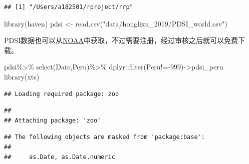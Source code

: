 \documentclass[
  oneside]{book}
\newenvironment{Shaded}{\begin{snugshade}}{\end{snugshade}}
\newcommand{\DecValTok}[1]{\textcolor[rgb]{0.00,0.00,0.81}{#1}}
\newcommand{\FunctionTok}[1]{\textcolor[rgb]{0.00,0.00,0.00}{#1}}
\newcommand{\NormalTok}[1]{#1}
\newcommand{\OtherTok}[1]{\textcolor[rgb]{0.56,0.35,0.01}{#1}}
\newcommand{\SpecialCharTok}[1]{\textcolor[rgb]{0.00,0.00,0.00}{#1}}
\newcommand{\StringTok}[1]{\textcolor[rgb]{0.31,0.60,0.02}{#1}}
\begin{document}
\begin{verbatim}
## [1] "/Users/a182501/rproject/rrp"
\end{verbatim}

\begin{Shaded}
\begin{Highlighting}[]
\FunctionTok{library}\NormalTok{(haven)}
\NormalTok{pdsi }\OtherTok{\textless{}{-}} \FunctionTok{read.csv}\NormalTok{(}\StringTok{"data/honglixu\_2019/PDSI\_world.csv"}\NormalTok{)}
\end{Highlighting}
\end{Shaded}

PDSI数据也可以从\href{https://www.esrl.noaa.gov/psd/data/gridded/data.pdsi.html}{NOAA}中获取，不过需要注册，经过审核之后就可以免费下载。

\begin{Shaded}
\begin{Highlighting}[]
\NormalTok{pdsi}\SpecialCharTok{\%\textgreater{}\%}
  \FunctionTok{select}\NormalTok{(Date,Peru)}\SpecialCharTok{\%\textgreater{}\%}
\NormalTok{  dplyr}\SpecialCharTok{::}\FunctionTok{filter}\NormalTok{(Peru}\SpecialCharTok{!={-}}\DecValTok{999}\NormalTok{)}\OtherTok{{-}\textgreater{}}\NormalTok{pdsi\_peru}
\FunctionTok{library}\NormalTok{(xts)}
\end{Highlighting}
\end{Shaded}

\begin{verbatim}
## Loading required package: zoo
\end{verbatim}

\begin{verbatim}
## 
## Attaching package: 'zoo'
\end{verbatim}

\begin{verbatim}
## The following objects are masked from 'package:base':
## 
##     as.Date, as.Date.numeric
\end{verbatim}
\end{document}
